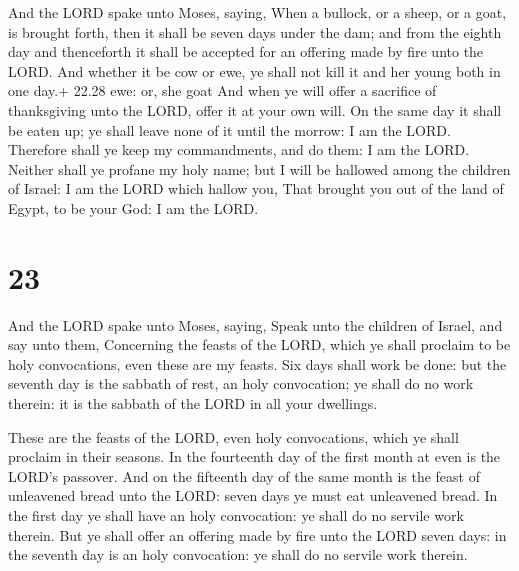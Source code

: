  And the LORD spake unto Moses, saying, 
When a bullock, or a sheep, or a goat, is brought forth, then it shall
be seven days under the dam; and from the eighth day and thenceforth it
shall be accepted for an offering made by fire unto the LORD.
 And whether it be cow or ewe, ye shall not kill it and her
young both in one day.+ 22.28 ewe: or, she goat  And when
ye will offer a sacrifice of thanksgiving unto the LORD, offer it at
your own will.  On the same day it shall be eaten up; ye
shall leave none of it until the morrow: I am the LORD. 
Therefore shall ye keep my commandments, and do them: I am the LORD.
 Neither shall ye profane my holy name; but I will be
hallowed among the children of Israel: I am the LORD which hallow you,
 That brought you out of the land of Egypt, to be your God:
I am the LORD.

\hypertarget{section-22}{%
\section{23}\label{section-22}}

 And the LORD spake unto Moses, saying,  Speak
unto the children of Israel, and say unto them, Concerning the feasts of
the LORD, which ye shall proclaim to be holy convocations, even these
are my feasts.  Six days shall work be done: but the seventh
day is the sabbath of rest, an holy convocation; ye shall do no work
therein: it is the sabbath of the LORD in all your dwellings.

 These are the feasts of the LORD, even holy convocations,
which ye shall proclaim in their seasons.  In the fourteenth
day of the first month at even is the LORD's passover.  And
on the fifteenth day of the same month is the feast of unleavened bread
unto the LORD: seven days ye must eat unleavened bread.  In
the first day ye shall have an holy convocation: ye shall do no servile
work therein.  But ye shall offer an offering made by fire
unto the LORD seven days: in the seventh day is an holy convocation: ye
shall do no servile work therein.

